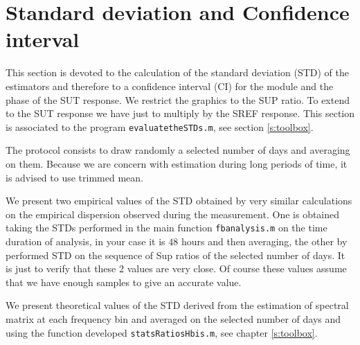 \newpage\clearpage
\section{Standard deviation and Confidence interval}
This section is devoted to the calculation of the standard deviation (STD) of the estimators and therefore to a confidence interval (CI) for the module and the phase of the SUT response. We restrict the graphics to the SUP ratio. To extend to the SUT response we have just to multiply by the SREF response. This section is associated to the program {\tt evaluatetheSTDs.m}, see section
\ref{s:toolbox}.

The protocol consists to draw randomly a selected number of days and averaging on them. Because we are concern with estimation during long periods of time, it is advised to use trimmed mean.

We present  two empirical values of the STD obtained by very similar calculations on the empirical dispersion observed during the measurement. One is obtained taking the STDs performed in the main function {\tt fbanalysis.m} on the time duration of analysis, in your case it is $48$ hours and then averaging, the other by performed STD on the sequence of Sup ratios of the selected number of days. It is just to verify that these 2 values are very close. Of course these values assume that we have enough samples to give an accurate value. 

We present theoretical values of the STD derived from the estimation of spectral matrix at each frequency bin and averaged on the selected number of days and using the function developed {\tt statsRatiosHbis.m}, see  chapter \ref{s:toolbox}.


\newpage\clearpage
